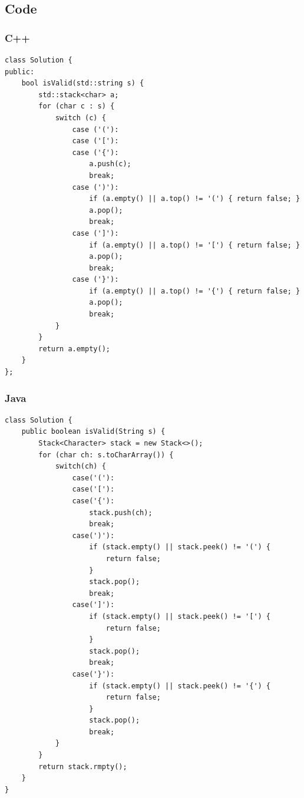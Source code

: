 \subsection*{Code}

\subsubsection*{C++}

\begin{verbatim}
class Solution {
public:
    bool isValid(std::string s) {
        std::stack<char> a;
        for (char c : s) {
            switch (c) {
                case ('('):
                case ('['):
                case ('{'):
                    a.push(c);
                    break;
                case (')'):
                    if (a.empty() || a.top() != '(') { return false; }
                    a.pop();
                    break;
                case (']'):
                    if (a.empty() || a.top() != '[') { return false; }
                    a.pop();
                    break;
                case ('}'):
                    if (a.empty() || a.top() != '{') { return false; }
                    a.pop();
                    break;
            }
        }
        return a.empty();
    }
};
\end{verbatim}

\subsubsection*{Java}

\begin{verbatim}
class Solution {
    public boolean isValid(String s) {
        Stack<Character> stack = new Stack<>();
        for (char ch: s.toCharArray()) {
            switch(ch) {
                case('('):
                case('['):
                case('{'):
                    stack.push(ch);
                    break;
                case(')'):
                    if (stack.empty() || stack.peek() != '(') {
                        return false;
                    }
                    stack.pop();
                    break;
                case(']'):
                    if (stack.empty() || stack.peek() != '[') {
                        return false;
                    }
                    stack.pop();
                    break;
                case('}'):
                    if (stack.empty() || stack.peek() != '{') {
                        return false;
                    }
                    stack.pop();
                    break;
            }
        }
        return stack.rmpty();
    }
}
\end{verbatim}

